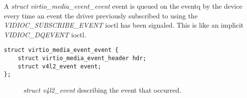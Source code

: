 A \textit{struct virtio_media_event_event} event is queued on the eventq by the
device every time an event the driver previously subscribed to using the
\textit{VIDIOC_SUBSCRIBE_EVENT} ioctl has been signaled. This is like an
implicit \textit{VIDIOC_DQEVENT} ioctl.

\begin{lstlisting}
struct virtio_media_event_event {
    struct virtio_media_event_header hdr;
    struct v4l2_event event;
};
\end{lstlisting}

\begin{description}
\item[] \textit{struct v4l2_event} describing the event that occurred.
\end{description}
